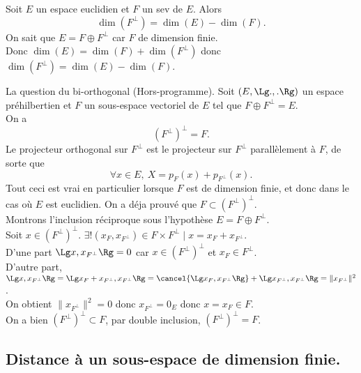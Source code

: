 \documentclass[11pt]{article}
\begin{document}
\begin{corr}{}{}
    Soit $E$ un espace euclidien et $F$ un sev de $E$. Alors
    \begin{equation*}
        \dim\left(F^\bot\right) = \dim(E) - \dim(F).
    \end{equation*}
    \tcblower
    On sait que $E=F\oplus F^\bot$ car $F$ de dimension finie.\\
    Donc $\dim(E) = \dim(F) + \dim\left(F^\bot\right)$ donc $\dim\left(F^\bot\right)=\dim(E)-\dim(F)$.
\end{corr}

\begin{prop}{La question du bi-orthogonal (Hors-programme).}{}
    Soit $(E,\Lg.,.\Rg)$ un espace préhilbertien et $F$ un sous-espace vectoriel de $E$ tel que $F\oplus F^\bot=E$.\\
    On a
    \begin{equation*}
        (F^\bot)^\bot = F.
    \end{equation*}
    Le projecteur orthogonal sur $F^\bot$ est le projecteur sur $F^\bot$ parallèlement à $F$, de sorte que
    \begin{equation*}
        \forall x \in E, ~ X = p_F(x)+p_{F^\bot}(x).
    \end{equation*} 
    Tout ceci est vrai en particulier lorsque $F$ est de dimension finie, et donc dans le cas où $E$ est euclidien.
    \tcblower
    On a déja prouvé que $F\subset (F^\bot)^\bot$.\\
    Montrons l'inclusion réciproque sous l'hypothèse $E=F\oplus F^\bot$.\\
    Soit $x\in (F^\bot)^\bot$. $\exists!(x_F,x_{F^\bot})\in F\times F^\bot \mid x=x_F+x_{F^\bot}$.\\
    D'une part $\Lg x, x_{F^\bot}\Rg=0$ car $x\in(F^\bot)^\bot$ et $x_F\in F^\bot$.\\
    D'autre part, $\Lg x, x_{F^\bot}\Rg=\Lg x_F + x_{F^\bot}, x_{F^\bot}\Rg = \cancel{\Lg x_F, x_{F^\bot} \Rg} + \Lg x_{F^\bot}, x_{F^\bot} \Rg=\|x_{F^\bot}\|^2$.\\
    On obtient $\|x_{F^\bot}\|^2=0$ donc $x_{F^\bot}=0_E$ donc $x=x_F\in F$.\\
    On a bien $(F^\bot)^\bot \subset F$, par double inclusion, $(F^\bot)^\bot=F$.
\end{prop}

\subsection{Distance à un sous-espace de dimension finie.}
\end{document}
